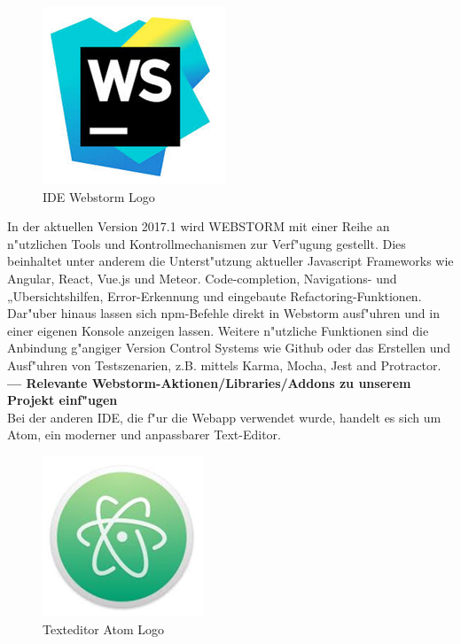 \documentclass[a4paper, 11pt]{scrreprt}
\begin{document}
\begin{figure} [h]
\begin{center}

\includegraphics[scale=0.6]{Webstorm.png}
\caption{IDE Webstorm Logo}
\label{webstorm_logo}

\end{center}
\end{figure}

In der aktuellen Version 2017.1 wird WEBSTORM mit einer Reihe an n"utzlichen Tools und Kontrollmechanismen zur Verf"ugung gestellt. Dies beinhaltet unter anderem die Unterst"utzung aktueller Javascript Frameworks wie Angular, React, Vue.js und Meteor. Code-completion, Navigations- und „Ubersichtshilfen, Error-Erkennung und eingebaute Refactoring-Funktionen. \\

Dar"uber hinaus lassen sich npm-Befehle direkt in Webstorm ausf"uhren und in einer eigenen Konsole anzeigen lassen. Weitere n"utzliche Funktionen sind die Anbindung g"angiger Version Control Systems wie Github oder das Erstellen und Ausf"uhren von Testszenarien, z.B. mittels Karma, Mocha, Jest and Protractor. \\

\textbf{--- Relevante Webstorm-Aktionen/Libraries/Addons zu unserem Projekt einf"ugen} \\

Bei der anderen IDE, die f"ur die Webapp verwendet wurde, handelt es sich um Atom, ein moderner und anpassbarer Text-Editor. \\

\begin{figure} [h]
\begin{center}

\includegraphics[scale=0.8]{atom.png}
\caption{Texteditor Atom Logo}
\label{webstorm_logo}

\end{center}
\end{figure}
\end{document}
